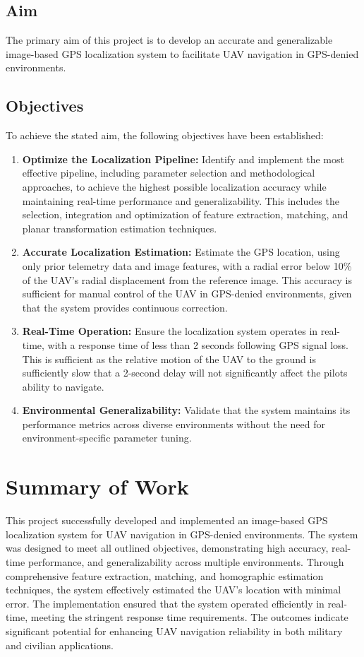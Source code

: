 \subsection{Aim}
The primary aim of this project is to develop an accurate and generalizable image-based GPS localization system to facilitate UAV navigation in GPS-denied environments.

\subsection{Objectives}
To achieve the stated aim, the following objectives have been established:

\begin{enumerate}
    \item \textbf{Optimize the Localization Pipeline:} Identify and implement the most effective pipeline, including parameter selection and methodological approaches, to achieve the highest possible localization accuracy while maintaining real-time performance and generalizability. This includes the selection, integration and optimization of feature extraction, matching, and planar transformation estimation techniques.
    
    \item \textbf{Accurate Localization Estimation:} Estimate the GPS location, using only prior telemetry data and image features, with a radial error below 10\% of the UAV's radial displacement from the reference image. This accuracy is sufficient for manual control of the UAV in GPS-denied environments, given that the system provides continuous correction.

    \item \textbf{Real-Time Operation:} Ensure the localization system operates in real-time, with a response time of less than 2 seconds following GPS signal loss. This is sufficient as the relative motion of the UAV to the ground is sufficiently slow that a 2-second delay will not significantly affect the pilots ability to navigate.
    
    \item \textbf{Environmental Generalizability:} Validate that the system maintains its performance metrics across diverse environments without the need for environment-specific parameter tuning.
\end{enumerate}

\section{Summary of Work}
This project successfully developed and implemented an image-based GPS localization system for UAV navigation in GPS-denied environments. The system was designed to meet all outlined objectives, demonstrating high accuracy, real-time performance, and generalizability across multiple environments. Through comprehensive feature extraction, matching, and homographic estimation techniques, the system effectively estimated the UAV's location with minimal error. The implementation ensured that the system operated efficiently in real-time, meeting the stringent response time requirements. The outcomes indicate significant potential for enhancing UAV navigation reliability in both military and civilian applications.

